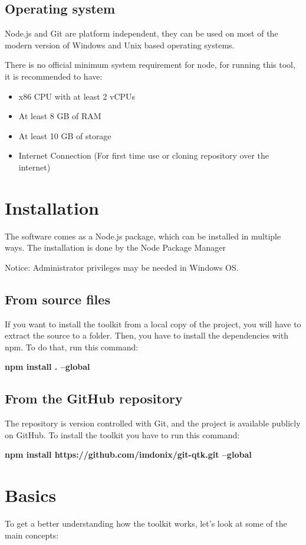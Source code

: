 \subsection{Operating system}
Node.js and Git are platform independent, they can be used on most of the modern version of Windows and Unix based operating systems.\newline

There is no official minimum system requirement for node, for running this tool, it is recommended to have:

\begin{itemize}
	\item x86 CPU with at least 2 vCPUs
	\item At least 8 GB of RAM
	\item At least 10 GB of storage  
	\item Internet Connection (For first time use or cloning repository over the internet)
\end{itemize}


\section{Installation}
The software comes as a Node.js package, which can be installed in multiple ways. 
The installation is done by the Node Package Manager 

Notice: Administrator privileges may be needed in Windows OS.

\subsection{From source files}
If you want to install the toolkit from a local copy of the project, you will have to extract the source to a folder. 
Then, you have to install the dependencies with npm.
To do that, run this command:

\textbf{npm install . --global}

\subsection{From the GitHub repository}
The repository is version controlled with Git, and the project is available publicly on GitHub. 
To install the toolkit you have to run this command:

\textbf{npm install https://github.com/imdonix/git-qtk.git --global}

\section{Basics}
To get a better understanding how the toolkit works, let’s look at some of the main concepts:

